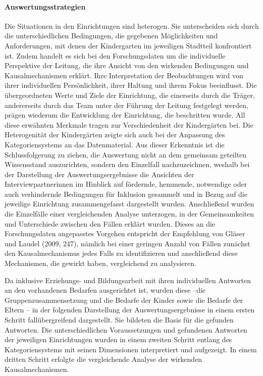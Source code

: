\paragraph{Auswertungsstrategien}
Die Situationen in den Einrichtungen sind heterogen. Sie unterscheiden sich durch die unterschiedlichen Bedingungen, die gegebenen Möglichkeiten und Anforderungen, mit denen der Kindergarten im jeweiligen Stadtteil konfrontiert ist. Zudem handelt es sich bei den Forschungsdaten um die individuelle Perspektive der Leitung, die ihre Ansicht von den wirkenden Bedingungen und Kausalmechanismen erklärt. Ihre Interpretation der Beobachtungen wird von ihrer individuellen Persönlichkeit, ihrer Haltung und ihrem Fokus beeinflusst. Die übergeordneten Werte und Ziele der Einrichtung, die einerseits durch die Träger, andererseits durch das Team unter der Führung der Leitung festgelegt werden, prägen wiederum die Entwicklung der Einrichtung, die beschritten wurde. All diese erwähnten Merkmale tragen zur Verschiedenheit der Kindergärten bei.   
Die Heterogenität der Kindergärten zeigte sich auch bei der Anpassung des Kategoriensystems an das Datenmaterial. 
Aus dieser Erkenntnis ist die Schlussfolgerung zu ziehen, die Auswertung nicht an dem gemeinsam geteilten Wissensstand auszurichten, sondern den Einzelfall nachzuzeichnen, weshalb bei der Darstellung der Auswertungsergebnisse die Ansichten der Interviewpartnerinnen im Hinblick auf fördernde, hemmende, notwendige oder auch verhindernde Bedingungen für Inklusion gesammelt und in Bezug auf die jeweilige Einrichtung zusammengefasst dargestellt wurden. Anschließend wurden die Einzelfälle einer vergleichenden Analyse unterzogen, in der Gemeinsamkeiten und Unterschiede zwischen den Fällen erklärt wurden. 
Dieses an die Forschungsdaten angepasstes Vorgehen entspricht der Empfehlung von Gläser und Laudel (2009, 247), nämlich bei einer geringen Anzahl von Fällen zunächst den Kausalmechanismus jedes Falls zu identifizieren und anschließend diese Mechanismen, die gewirkt haben, vergleichend zu analysieren.  

Da inklusive Erziehungs- und Bildungsarbeit mit ihren individuellen Antworten an den vorhandenen Bedarfen ausgerichtet ist, wurden diese --die Gruppenzusammensetzung und die Bedarfe der Kinder sowie die Bedarfe der Eltern -- in der folgenden Darstellung der Auswertungsergebnisse in einem ersten Schritt fallübergreifend dargestellt. Sie bildeten die Basis für die gefunden Antworten. Die unterschiedlichen Voraussetzungen und gefundenen Antworten der jeweiligen Einrichtungen wurden in einem  zweiten Schritt entlang des Kategoriensystems mit seinen Dimensionen interpretiert und aufgezeigt. In einem dritten Schritt erfolgte die vergleichende Analyse der wirkenden Kausalmechanismen.  

